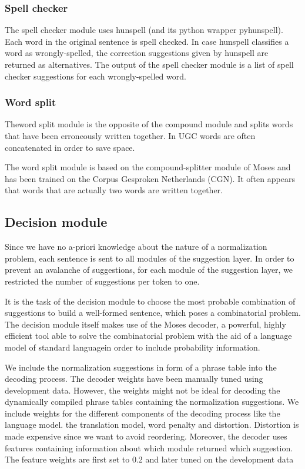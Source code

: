 \documentclass[letterpaper,10pt,english]{sphinxmanual}
\begin{document}
\subsubsection{Spell checker}
\label{README:spell-checker}
The spell checker module uses hunspell (and its python wrapper pyhunspell). Each word in the original sentence is spell checked.
In case hunspell classifies a word as wrongly-spelled, the correction suggestions given by hunspell are returned as alternatives.
The output of the spell checker module is a list of spell checker suggestions for each wrongly-spelled word.


\subsubsection{Word split}
\label{README:word-split}
Theword split module is the opposite of the compound module and splits words that have been erroneously written together. In UGC words are often concatenated in order to save space.

The word split module is based on the compound-splitter module of Moses  and has been trained on the Corpus Gesproken Netherlands (CGN).
It often appears that words that are actually two words are written together.


\subsection{Decision module}
\label{README:decision-module}
Since we have no a-priori knowledge about the nature of a normalization problem, each sentence is sent to all modules of the suggestion  layer. In order to prevent an avalanche of suggestions, for each module of the suggestion layer, we restricted the number of suggestions per token to one.

It is the task of the decision module to choose the most probable combination of suggestions  to build a well-formed sentence, which poses a combinatorial problem. The decision module itself makes use of the Moses decoder, a powerful, highly efficient tool able to solve the combinatorial problem with the aid of a language model of standard languagein order to include probability information.

We include the normalization suggestions in form of a phrase table into the decoding process. The decoder weights have been manually tuned using development data. However, the weights might not be ideal for decoding the dynamically compiled phrase tables containing the normalization suggestions. We include weights for the different components of the decoding process like the language model. the translation model, word penalty and distortion. Distortion is made expensive since we want to avoid reordering. Moreover, the decoder uses features containing information about which module returned which suggestion. The feature weights are first set to 0.2 and later tuned on the development data
\end{document}
